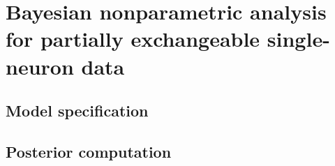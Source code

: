 \chapter{Bayesian nonparametric analysis for partially exchangeable single-neuron data }

\fancyhead[RO,LE]{\thepage}

\setlength{\parskip}{0.5pt}

\bigskip

\section{Model specification} 

\section{Posterior computation}
